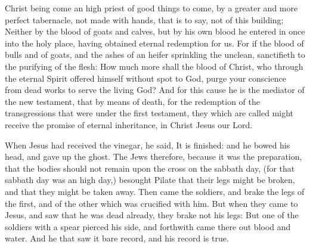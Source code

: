  Christ being come an high priest of good things to come, by a greater and more perfect tabernacle, not made with hands, that is to say, not of this building; Neither by the blood of goats and calves, but by his own blood he entered in once into the holy place, having obtained eternal redemption for us. For if the blood of bulls and of goats, and the ashes of an heifer sprinkling the unclean, sanctifieth to the purifying of the flesh: How much more shall the blood of Christ, who through the eternal Spirit offered himself without spot to God, purge your conscience from dead works to serve the living God? And for this cause he is the mediator of the new testament, that by means of death, for the redemption of the transgressions that were under the first testament, they which are called might receive the promise of eternal inheritance, %
in Christ Jesus our Lord.


 When Jesus had received the vinegar, he said, It is finished: and he bowed his head, and gave up the ghost. The Jews therefore, because it was the preparation, that the bodies should not remain upon the cross on the sabbath day, (for that sabbath day was an high day,) besought Pilate that their legs might be broken, and that they might be taken away. Then came the soldiers, and brake the legs of the first, and of the other which was crucified with him. But when they came to Jesus, and saw that he was dead already, they brake not his legs: But one of the soldiers with a spear pierced his side, and forthwith came there out blood and water. And he that saw it bare record, and his record is true.


